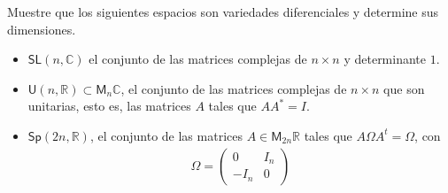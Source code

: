 \documentclass[11pt]{article}
\newcommand{\R}{\mathbb{R}}
\newcommand{\C}{\mathbb{C}}
\newcommand{\M}[2]{\mathsf{M}_{#1}#2}
\newcommand{\paint}[2]{\color{#1}{#2}}
\newenvironment{exercise}[2][Ejercicio]{\begin{trivlist}
\item[\hskip \labelsep \paint{purple}{{\bfseries #1}}\hskip \labelsep {\bfseries #2.}]}{\end{trivlist}}
\begin{document}
\begin{exercise}{5} Muestre que los siguientes espacios son variedades diferenciales y determine sus
dimensiones. 
\begin{itemize}
\item[(i)] $\mathsf{SL}(n,\C)$ el conjunto de las matrices complejas de $n \times n$ y determinante $1$.
\item[(ii)] $\mathsf{U}(n,\R) \subset \M{n}{\C}$, el conjunto de las matrices complejas de $n \times n$ que son unitarias, esto es, las matrices $A$ tales que $AA^* = I$.
\item[(iii)] $\mathsf{Sp}(2n,\R)$, el conjunto de las matrices $A \in \mathsf{M}_{2n}\R$ tales que $A\Omega A^t=\Omega$, con
\begin{align*}
  \Omega=\begin{pmatrix}0&I_n\\-I_n&0\end{pmatrix}
\end{align*}
\end{itemize}
\end{exercise}
\end{document}
